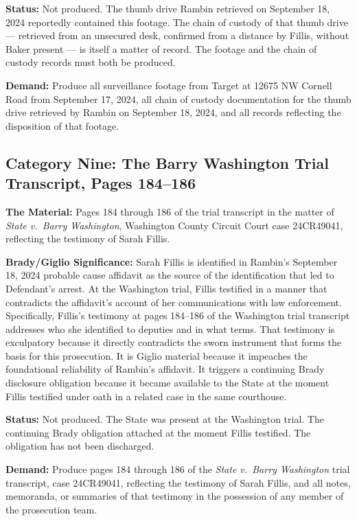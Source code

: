 \documentclass[12pt,letterpaper]{extarticle}
\begin{document}
	\textbf{Status:} Not produced. The thumb drive Rambin retrieved on September 18,
	2024 reportedly contained this footage. The chain of custody of that thumb drive ---
	retrieved from an unsecured desk, confirmed from a distance by Fillis, without
	Baker present --- is itself a matter of record. The footage and the chain of custody
	records must both be produced.
	
	\textbf{Demand:} Produce all surveillance footage from Target at 12675 NW Cornell
	Road from September 17, 2024, all chain of custody documentation for the thumb
	drive retrieved by Rambin on September 18, 2024, and all records reflecting the
	disposition of that footage.
	
	\subsection{Category Nine: The Barry Washington Trial Transcript, Pages 184--186}
	
	\textbf{The Material:} Pages 184 through 186 of the trial transcript in the matter
	of \textit{State v.\ Barry Washington}, Washington County Circuit Court case
	24CR49041, reflecting the testimony of Sarah Fillis.
	
	\textbf{Brady/Giglio Significance:} Sarah Fillis is identified in Rambin's
	September 18, 2024 probable cause affidavit as the source of the identification
	that led to Defendant's arrest. At the Washington trial, Fillis testified in a
	manner that contradicts the affidavit's account of her communications with law
	enforcement. Specifically, Fillis's testimony at pages 184--186 of the Washington
	trial transcript addresses who she identified to deputies and in what terms.
	That testimony is exculpatory because it directly contradicts the sworn instrument
	that forms the basis for this prosecution. It is Giglio material because it
	impeaches the foundational reliability of Rambin's affidavit. It triggers a
	continuing Brady disclosure obligation because it became available to the State at
	the moment Fillis testified under oath in a related case in the same courthouse.
	
	\textbf{Status:} Not produced. The State was present at the Washington trial. The
	continuing Brady obligation attached at the moment Fillis testified. The obligation
	has not been discharged.
	
	\textbf{Demand:} Produce pages 184 through 186 of the \textit{State v.\ Barry
		Washington} trial transcript, case 24CR49041, reflecting the testimony of Sarah
	Fillis, and all notes, memoranda, or summaries of that testimony in the possession
	of any member of the prosecution team.
	
\end{document}
